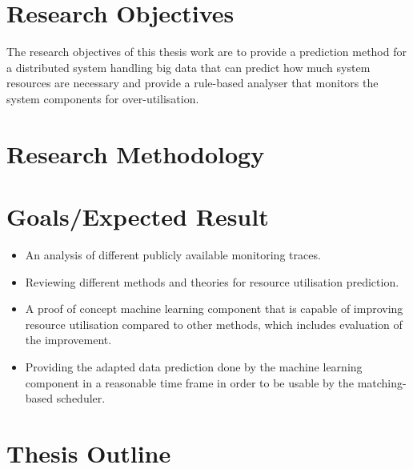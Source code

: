 
        
        \section{Research Objectives}
        \label{sec:research-objectives-introduction}

            The research objectives of this thesis work are to provide a prediction method for a distributed system handling big data that can predict how much system resources are necessary and provide a rule-based analyser that monitors the system components for over-utilisation.

        \section{Research Methodology}
        \label{sec:research-methodology-introduction}

        
        \section{Goals/Expected Result}
        \label{sec:goals-results-introduction}

            \begin{itemize}
                \item An analysis of different publicly available monitoring traces.
                \item Reviewing different methods and theories for resource utilisation prediction.
                \item A proof of concept machine learning component that is capable of improving resource utilisation compared to other methods, which includes evaluation of the improvement.
                \item Providing the adapted data prediction done by the machine learning component in a reasonable time frame in order to be usable by the matching-based scheduler.
                
            \end{itemize}
        
        \section{Thesis Outline}
        \label{sec:thesis-outline-introduction}

